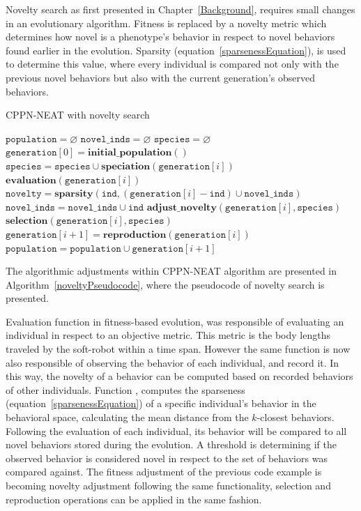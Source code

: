 Novelty search as first presented in Chapter~\ref{Background}, requires small changes in an evolutionary algorithm. Fitness is replaced by a novelty metric which determines how novel is a phenotype's behavior in respect to novel behaviors found earlier in the evolution. Sparsity (equation~\ref{sparsenessEquation}), is used to determine this value, where every individual is compared not only with the previous novel behaviors but also with the current generation's observed behaviors.



\begin{algorithm}[t!]
\caption{CPPN-NEAT with novelty search}
\label{noveltyPseudocode}
\begin{algorithmic}[1]
\STATE $\mathtt{population} = \varnothing$
\STATE $\mathtt{novel\_inds} = \varnothing$
\STATE $\mathtt{species} = \varnothing$
\STATE $\mathtt{generation}[0] = \mathbf{initial\_population}()$
\STATE $\mathtt{species} = \mathtt{species} \cup \mathbf{speciation}(\mathtt{generation}[i])$
\STATE $\mathbf{evaluation}(\mathtt{generation}[i])$
\STATE $\mathtt{novelty} = \mathbf{sparsity}(\mathtt{ind}, (\mathtt{generation}[i] - \mathtt{ind}) \cup \mathtt{novel\_inds})$
\STATE $\mathtt{novel\_inds} = \mathtt{novel\_inds} \cup \mathtt{ind}$
\ENDIF
\ENDFOR
\STATE $\mathbf{adjust\_novelty}(\mathtt{generation}[i], \mathtt{species})$
\STATE $\mathbf{selection}(\mathtt{generation}[i], \mathtt{species})$
\STATE $\mathtt{generation}[i+1] = \mathbf{reproduction}(\mathtt{generation}[i])$
\STATE $\mathtt{population} = \mathtt{population} \cup \mathtt{generation}[i+1]$
\ENDFOR
\end{algorithmic}
\end{algorithm}


The algorithmic adjustments within CPPN-NEAT algorithm are presented in Algorithm~\ref{noveltyPseudocode}, where the pseudocode of novelty search is presented.

Evaluation function in fitness-based evolution, was responsible of evaluating an individual in respect to an objective metric. This metric is the body lengths traveled by the soft-robot within a time span. However the same function is now also responsible of observing the behavior of each individual, and record it. In this way, the novelty of a behavior can be computed based on recorded behaviors of other individuals. Function , computes the sparseness (equation~\ref{sparsenessEquation}) of a specific individual's behavior in the behavioral space, calculating the mean distance from the $k$-closest behaviors. Following the evaluation of each individual, its behavior will be compared to all novel behaviors stored during the evolution. A threshold is determining if the observed behavior is considered novel in respect to the set of behaviors was compared against. The fitness adjustment of the previous code example is becoming novelty adjustment following the same functionality, selection and reproduction operations can be applied in the same fashion.


